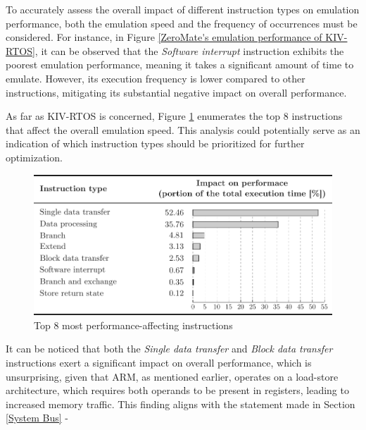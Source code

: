 \documentclass[english, ing, kiv, he, iso690numb, pdf]{fasthesis}
\begin{document}
	To accurately assess the overall impact of different instruction types on emulation performance, both the emulation speed and the frequency of occurrences must be considered. For instance, in Figure \ref{ZeroMate's emulation performance of KIV-RTOS}, it can be observed that the \textit{Software interrupt} instruction exhibits the poorest emulation performance, meaning it takes a significant amount of time to emulate. However, its execution frequency is lower compared to other instructions, mitigating its substantial negative impact on overall performance.
	
	As far as KIV-RTOS is concerned, Figure \ref{Top 8 most performance-affecting instructions} enumerates the top 8 instructions that affect the overall emulation speed. This analysis could potentially serve as an indication of which instruction types should be prioritized for further optimization.
	
	\begin{figure}[ht]
		\centering
		\includegraphics[width=1.0\textwidth]{img/diagrams/performance_2.pdf}
		\caption{Top 8 most performance-affecting instructions\protect\footnotemark}
		\label{Top 8 most performance-affecting instructions}
	\end{figure}
	
	It can be noticed that both the \textit{Single data transfer} and \textit{Block data transfer} instructions exert a significant impact on overall performance, which is unsurprising, given that ARM, as mentioned earlier, operates on a load-store architecture, which requires both operands to be present in registers, leading to increased memory traffic. This finding aligns with the statement made in Section \ref{System Bus} - \textit{}
	
	
\end{document}
